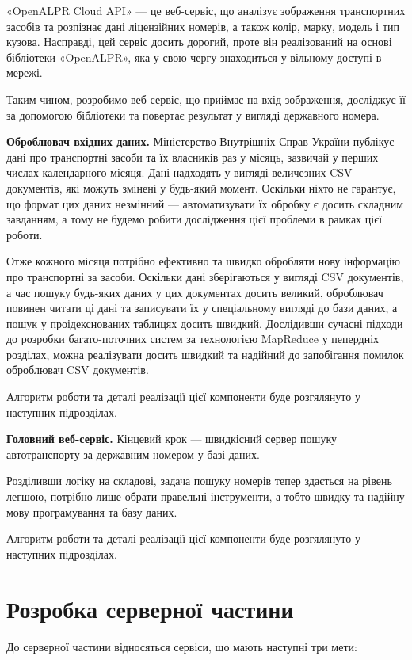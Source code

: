 «OpenALPR Cloud API» — це веб-сервіс, що аналізує зображення транспортних засобів та розпізнає
дані ліцензійних номерів, а також колір, марку, модель і тип кузова.
Насправді, цей сервіс досить дорогий, проте він реалізований на основі
бібліотеки «OpenALPR», яка у свою чергу знаходиться у вільному доступі в мережі.

Таким чином, розробимо веб сервіс, що приймає на вхід зображення,
досліджує її за допомогою бібліотеки та повертає результат у вигляді державного номера.

\textbf{Оброблювач вхідних даних.}
Міністерство Внутрішніх Справ України публікує дані про транспортні засоби та їх власників раз у
місяць, зазвичай у перших числах календарного місяця.
Дані надходять у вигляді величезних CSV документів, які можуть змінені у будь-який момент.
Оскільки ніхто не гарантує, що формат
цих даних незмінний — автоматизувати їх обробку є досить складним завданням, а тому не будемо
робити дослідження цієї проблеми в рамках цієї роботи.

Отже кожного місяця потрібно ефективно та швидко обробляти нову інформацію
про транспортні за засоби.
Оскільки дані зберігаються у вигляді CSV документів, а час пошуку будь-яких даних у цих документах
досить великий, оброблювач повинен читати ці дані та записувати їх у спеціальному
вигляді до бази даних, а пошук у проідекснованих таблицях досить швидкий.
Дослідивши сучасні підходи до розробки багато-поточних
систем за технологією MapReduce у пепердніх розділах, можна реалізувати досить швидкий та
надійний до запобігання помилок оброблювач CSV документів.

Алгоритм роботи та деталі реалізації цієї компоненти буде розгялянуто у наступних підрозділах.

\textbf{Головний веб-сервіс.}
Кінцевий крок — швидкісний сервер пошуку автотранспорту за
державним номером у базі даних.

Розділивши логіку на складові, задача пошуку номерів тепер здається на рівень легшою,
потрібно лише обрати правельні інструменти,
а тобто швидку та надійну мову програмування та базу даних.

Алгоритм роботи та деталі реалізації цієї компоненти буде розгялянуто у наступних підрозділах.

\section{Розробка серверної частини}

До серверної частини відносяться сервіси, що мають наступні три мети:

